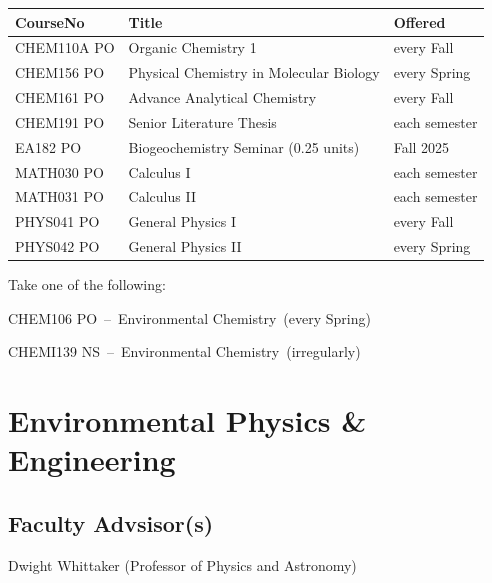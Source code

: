 \documentclass{article}\usepackage[]{graphicx}\usepackage[]{xcolor}
\newenvironment{itemize*}%
  {\begin{itemize}%
    \setlength{\itemsep}{0pt}%
    \setlength{\parskip}{0pt}}%
  {\end{itemize}}
\begin{document}
\begin{description}
\begin{table}[ht]
\centering
\begin{tabular}{lll}
  \hline
CourseNo & Title & Offered \\ 
  \hline
CHEM110A PO & Organic Chemistry 1 & every  Fall \\ 
  CHEM156 PO & Physical Chemistry in Molecular Biology & every Spring \\ 
  CHEM161 PO & Advance Analytical Chemistry & every  Fall \\ 
  CHEM191 PO & Senior Literature Thesis & each semester \\ 
  EA182 PO & Biogeochemistry Seminar (0.25 units) & Fall 2025 \\ 
  MATH030 PO & Calculus I & each semester \\ 
  MATH031 PO & Calculus II & each semester \\ 
  PHYS041 PO & General Physics I & every  Fall \\ 
  PHYS042 PO & General Physics II & every Spring \\ 
   \hline
\end{tabular}
\end{table}


\item[Environmental Chemistry] Take one of the following: 

\begin{itemize*}
  \item CHEM106 PO~--~Environmental Chemistry~(every Spring)
  \item CHEMI139 NS~--~Environmental Chemistry~(irregularly)
\end{itemize*}



\end{description}

\newpage %
\section{Environmental Physics \& Engineering}



\subsection{Faculty Advsisor(s)}

\begin{itemize*}
  \item Dwight Whittaker (Professor of Physics and Astronomy)
\end{itemize*}
\end{document}
